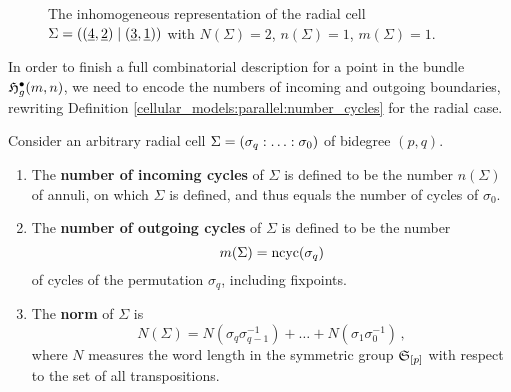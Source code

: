 \begin{figure}[ht]
\centering
{}
\caption{\label{radial:slit_annuli:inhomogeneous_cell} The inhomogeneous representation of the radial cell $\Sigma = ((\underline{\smash{4}}, \underline{\smash{2}})\mid (\underline{\smash{3}}, \underline{\smash{1}}))$ with $N(\Sigma) = 2$, $n(\Sigma) = 1$, $m(\Sigma) = 1$.}
\end{figure}

In order to finish a full combinatorial description for a point in the bundle $\mathfrak{H}^{\bullet}_g(m, n)$, 
we need to encode the numbers of incoming and outgoing boundaries,
rewriting Definition \ref{cellular_models:parallel:number_cycles} for the radial case.

\begin{defi}
    \label{cellular_models:radial:number_cycles}
    \label{cellular_models:radial:number_punctures}
    \label{cellular_models:radial:number_boundaries}
    \label{cellular_models:radial:norm}

    Consider an arbitrary radial cell $\Sigma = \homogq$ of bidegree $(p,q)$.
    \begin{enumerate}
        \item The {\bfseries number of incoming cycles} of $\Sigma$ is defined to be the number $n(\Sigma)$ of annuli, on which $\Sigma$ is defined,
              and thus equals the number of cycles of $\sigma_0$.
        \item The {\bfseries number of outgoing cycles} of $\Sigma$ is defined to be the number 
            \[
                m( \Sigma ) = \operatorname{ncyc}( \sigma_q)
            \]
	    of cycles of the permutation $\sigma_q$, including fixpoints.
        \item The {\bfseries norm} of $\Sigma$ is
            \[
                N(\Sigma) = N(\sigma_q\sigma_{q-1}^{-1}) + \ldots + N(\sigma_1\sigma_0^{-1}) \,,
            \]
            where $N$ measures the word length in the symmetric group $\mathfrak S_{[p]}$ with respect to the set of all transpositions.
    \end{enumerate}
\end{defi}

